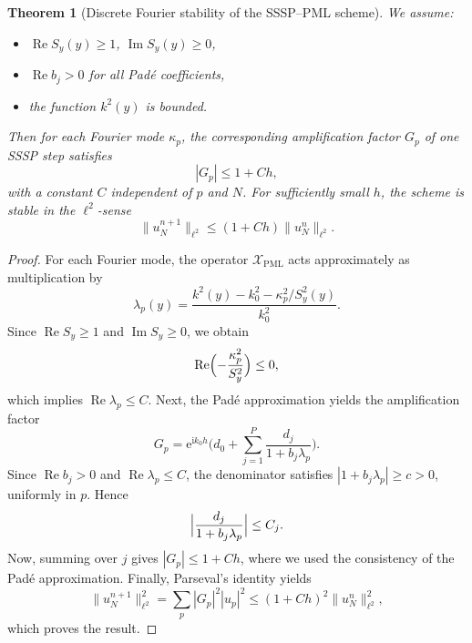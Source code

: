 \documentclass[10pt,a4paper]{amsart}
\newtheorem{theorem}{Theorem}
\DeclareMathOperator{\Imag}{Im}
\DeclareMathOperator{\Real}{Re}
\newcommand{\cX}{\mathcal{X}}
\newcommand{\iu}{\mathrm{i}} %
\begin{document}
\begin{theorem}[Discrete Fourier stability of the SSSP--PML scheme]
We assume:
\begin{itemize}
\item $\Real S_y(y) \ge 1$, $\Imag S_y(y) \ge 0$,
\item $\Real b_j > 0$ for all Pad\'e coefficients,
\item the function $k^2(y)$ is bounded.
\end{itemize}
Then for each Fourier mode $\kappa_p$, the corresponding amplification factor $G_p$ of one SSSP step satisfies
\begin{equation*}
     |G_p| \le 1 + C h,
\end{equation*}
with a constant $C$ independent of $p$ and $N$. 
For sufficiently small $h$, the scheme is stable in the $\ell^2$-sense
\begin{equation*}
\|u^{n+1}_N\|_{\ell^2} \le (1 + C h)\|u^n_N\|_{\ell^2}.
\end{equation*}
\end{theorem}

\begin{proof}
For each Fourier mode, the operator $\cX_{\mathrm{PML}}$ acts approximately as multiplication by
\begin{equation*}
     \lambda_p(y) = \frac{k^2(y) - k_0^2 - \kappa_p^2 / S_y^2(y)}{k_0^2}.
\end{equation*}
Since $\Real S_y \ge 1$ and $\Imag S_y \ge 0$, we obtain
\begin{equation*}
   \Real\Bigl(-\frac{\kappa_p^2}{S_y^2}\Bigr) \le 0,
\end{equation*}
which implies
    $\Real \lambda_p \le C$.
%
Next, the Pad\'e approximation yields the amplification factor
\begin{equation*} 
   G_p = \mathrm{e}^{\iu k_0 h} \biggl(d_0 + \sum_{j=1}^P \frac{d_j}{1 + b_j \lambda_p} \biggr).
\end{equation*}
Since $\Real b_j > 0$ and $\Real \lambda_p \le C$, the denominator satisfies
$|1 + b_j \lambda_p| \ge c > 0$,
uniformly in $p$. Hence
\begin{equation*}
\Bigl| \frac{d_j}{1 + b_j \lambda_p} \Bigr| \le C_j.
\end{equation*}
Now, summing over $j$ gives
$|G_p| \le 1 + C h$,
where we used the consistency of the Pad\'e approximation.
%
Finally, Parseval's identity yields
\begin{equation*}
   \|u^{n+1}_N\|_{\ell^2}^2 = \sum_p |G_p|^2 |\hat{u}_p|^2 \le (1 + C h)^2 \|u^n_N\|_{\ell^2}^2,
\end{equation*}
which proves the result.
\end{proof}
\end{document}
